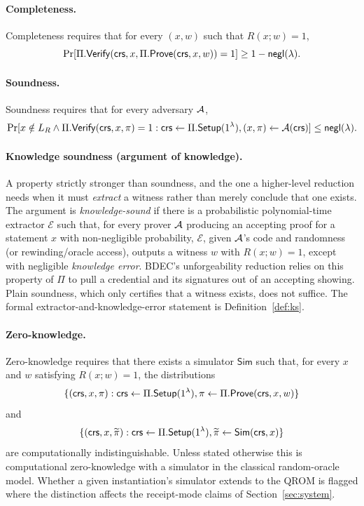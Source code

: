 \paragraph{Completeness.}
Completeness requires that for every $(x,w)$ such that $R(x;w)=1$,
\begin{equation*}
  \Pr[\Pi.\mathsf{Verify}(\mathsf{crs},x,\Pi.\mathsf{Prove}(\mathsf{crs},x,w))=1]\geq 1-\mathsf{negl}(\lambda).
\end{equation*}

\paragraph{Soundness.}
Soundness requires that for every adversary $\mathcal{A}$,
\begin{equation*}
  \Pr[
  x\notin L_R \land \Pi.\mathsf{Verify}(\mathsf{crs},x,\pi)=1
  :
  \mathsf{crs}\leftarrow\Pi.\mathsf{Setup}(1^\lambda),
  (x,\pi)\leftarrow\mathcal{A}(\mathsf{crs})
  ]\leq \mathsf{negl}(\lambda).
\end{equation*}

\paragraph{Knowledge soundness (argument of knowledge).}
A property strictly stronger than soundness, and the one a higher-level reduction needs when it must \emph{extract} a witness rather than merely conclude that one exists. The argument is \emph{knowledge-sound} if there is a probabilistic polynomial-time extractor $\mathcal{E}$ such that, for every prover $\mathcal{A}$ producing an accepting proof for a statement $x$ with non-negligible probability, $\mathcal{E}$, given $\mathcal{A}$'s code and randomness (or rewinding/oracle access), outputs a witness $w$ with $R(x;w)=1$, except with negligible \emph{knowledge error}. BDEC's unforgeability reduction relies on this property of $\Pi$ to pull a credential and its signatures out of an accepting showing. Plain soundness, which only certifies that a witness exists, does not suffice. The formal extractor-and-knowledge-error statement is Definition~\ref{def:ks}.

\paragraph{Zero-knowledge.}
Zero-knowledge requires that there exists a simulator $\mathsf{Sim}$ such that, for every $x$ and $w$ satisfying $R(x;w)=1$, the distributions
\begin{equation*}
  \{(\mathsf{crs},x,\pi):\mathsf{crs}\leftarrow\Pi.\mathsf{Setup}(1^\lambda),
  \pi\leftarrow\Pi.\mathsf{Prove}(\mathsf{crs},x,w)\}
\end{equation*}
and
\begin{equation*}
  \{(\mathsf{crs},x,\widetilde\pi):\mathsf{crs}\leftarrow\Pi.\mathsf{Setup}(1^\lambda),
  \widetilde\pi\leftarrow\mathsf{Sim}(\mathsf{crs},x)\}
\end{equation*}
are computationally indistinguishable. Unless stated otherwise this is computational zero-knowledge with a simulator in the classical random-oracle model. Whether a given instantiation's simulator extends to the QROM is flagged where the distinction affects the receipt-mode claims of Section~\ref{sec:system}.

